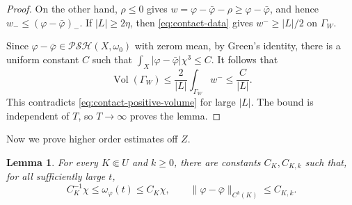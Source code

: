 \documentclass[reqno]{amsart}
\theoremstyle{remark}
\newcommand{\Psh}{\mathcal{PSH}}
\theoremstyle{plain}
\newtheorem{lemma}[thm]{Lemma}
\begin{document}
\begin{proof}
On the other hand, $\rho\leq0$ gives $w=\varphi-\bar{\varphi}-\rho\geq \varphi-\bar{\varphi}$, and hence
$w_-\leq (\varphi-\bar{\varphi})_-$.  If $|L|\geq2\eta$, then
\eqref{eq:contact-data} gives $w^-\geq|L|/2$ on $\Gamma_W$.

 Since $\varphi-\bar\varphi\in \Psh(X,\omega_0)$ with zerom mean, by Green's identity, there is a uniform constant $C$ such that $\int_X|\varphi-\bar\varphi|\chi^3\leq C. $
 It follows that 
\[
 \operatorname{Vol}(\Gamma_W)
 \leq\frac{2}{|L|}\int_{\Gamma_W}w^-
 \leq\frac{C}{|L|}.
\]
This contradicts \eqref{eq:contact-positive-volume} for large
$|L|$.  The bound is independent of $T$, so $T\to\infty$
proves the lemma.

\end{proof}

Now we prove higher order estimates off $Z$. 

\begin{lemma}\label{lem:local-c2}
    For every $K\Subset U$ and $k\geq0$, there are constants
$C_K,C_{K,k}$ such that, for all sufficiently large $t$,
\[
 C_K^{-1}\chi\leq\omega_\varphi(t)\leq C_K\chi,
 \qquad
 \|\varphi-\bar\varphi\|_{C^k(K)}\leq C_{K,k}.
\]
\end{lemma}
\end{document}
